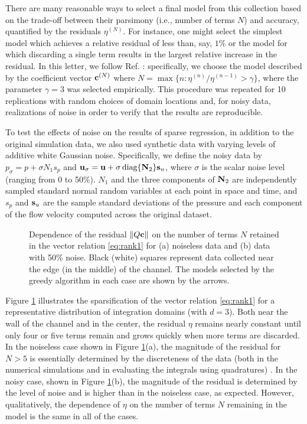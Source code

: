 \documentclass[
 reprint,
 amsmath,amssymb,
 aps,
]{revtex4-2}
\begin{document}
There are many reasonable ways to select a final model from this collection based on the trade-off between their parsimony (i.e., number of terms $N$) and accuracy, quantified by the residuals $\eta^{(N)}$. For instance, one might select the simplest model which achieves a relative residual of less than, say, $1\%$ or the model for which discarding a single term results in the largest relative increase in the residual. In this letter, we follow Ref. \cite{gurevich2019}: specifically, we choose the model described by the coefficient vector ${\bf c}^{(N)}$ where $N = \max\{n : \eta^{(n)}/\eta^{(n-1)} > \gamma\}$, where the parameter $\gamma = 3$ was selected empirically. This procedure was repeated for 10 replications with random choices of domain locations and, for noisy data, realizations of noise in order to verify that the results are reproducible. 

To test the effects of noise on the results of sparse regression, in addition to the original simulation data, we also used synthetic data with varying levels of additive white Gaussian noise. Specifically, we define the noisy data by $p_{\sigma} = p + \sigma N_1 s_p$ and ${\bf u}_{\sigma} = {\bf u} + \sigma\,\text{diag}\{{\bf N}_2\}{\bf s}_u$, where $\sigma$ is the scalar noise level (ranging from 0 to 50\%). $N_1$ and the three components of ${\bf N}_2$ are independently sampled standard normal random variables at each point in space and time, and $s_p$ and ${\bf s}_u$ are the sample standard deviations of the pressure and each component of the flow velocity computed across the original dataset.

\begin{figure*}[t]
\centering
{}
\hfill
{}
\caption{Dependence of the residual $\|Q{\bf c}\|$ on the number of terms $N$ retained in the vector relation \eqref{eq:rank1} for (a) noiseless data and (b) data with 50\% noise. Black (white) squares represent data collected near the edge (in the middle) of the channel. The models selected by the greedy algorithm in each case are shown by the arrows.
}
\label{fig:pareto}
\end{figure*}

Figure \ref{fig:pareto} illustrates the sparsification of the vector relation \eqref{eq:rank1} for a representative distribution of integration domains (with $d=3$). Both near the wall of the channel and in the center, the residual $\eta$ remains nearly constant until only four or five terms remain and grows quickly when more terms are discarded. In the noiseless case shown in Figure \ref{fig:pareto}(a), the magnitude of the residual for $N>5$ is essentially determined by the discreteness of the data (both in the numerical simulations and in evaluating the integrals using quadratures) \cite{gurevich2019}. In the noisy case, shown in Figure \ref{fig:pareto}(b), the magnitude of the residual is determined by the level of  noise and is higher than in the noiseless case, as expected. However, qualitatively, the dependence of $\eta$ on the number of terms $N$ remaining in the model is the same in all of the cases.
\end{document}
